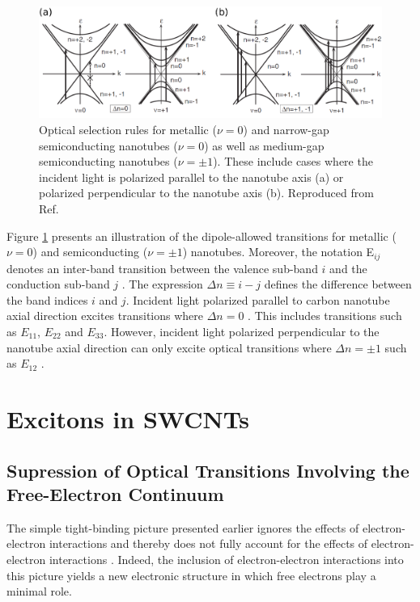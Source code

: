 \begin{figure}[ht]
	\centering
	\includegraphics[scale= 0.52]{images/chapter_optical_props/selection_rules_combined}
	\caption{Optical selection rules for metallic ($\nu = 0 $) and narrow-gap semiconducting nanotubes ($\nu = 0 $) as well as medium-gap semiconducting nanotubes ($\nu = \pm 1$). These include cases where the incident light is polarized parallel to the nanotube axis (a) or polarized perpendicular to the nanotube axis (b). Reproduced from Ref.\ \cite{ando2005theory}}
	\label{fig:allowed_optical_transitions}
\end{figure}

Figure \ref{fig:allowed_optical_transitions} presents an illustration of the dipole-allowed transitions for metallic ($\nu = 0$) and semiconducting ($\nu=\pm 1$) nanotubes. Moreover, the notation E$_{ij}$ denotes an inter-band transition between the valence sub-band $i$ and the conduction sub-band $j$ \cite{weismanKonoBook}. The expression $\Delta n \equiv i - j$ defines the difference between the band indices $i$ and $j$. Incident light polarized parallel to carbon nanotube axial direction excites transitions where $\Delta n = 0$ \cite{weismanKonoBook}. This includes transitions such as $E_{11}$, $E_{22}$ and $E_{33}$. However, incident light polarized perpendicular to the nanotube axial direction can only excite optical transitions where $\Delta n = \pm 1$ such as $E_{12}$ \cite{weismanKonoBook}.


\section{Excitons in SWCNTs}

\subsection{Supression of Optical Transitions Involving the Free-Electron Continuum}
The simple tight-binding picture presented earlier ignores the effects of electron-electron interactions and thereby does not fully account for the effects of electron-electron interactions \cite{weismanKonoBook}. Indeed, the inclusion of electron-electron interactions into this picture yields a new electronic structure in which free electrons play a minimal role.

